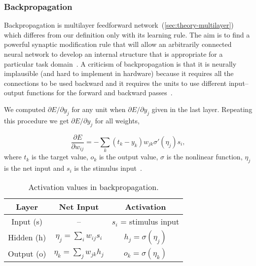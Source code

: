 \subsubsection{Backpropagation}
\label{sec:models-bp} 

Backpropagation is multilayer feedforward network~(\ref{sec:theory-multilayer}) which differes from our definition only with its learning rule. The aim is to find a powerful synaptic modification rule that will allow an arbitrarily connected neural network to develop an internal structure that is appropriate for a particular task domain~\citep{rumelhart1986learning}. A criticism of backpropagation is that it is neurally implausible (and hard to implement in hardware) because it requires all the connections to be used backward and it requires the units to use different input--output functions for the forward and backward passes~\citep{hinton1988learning}.

We computed $\partial E / \partial y_j$ for any unit when $\partial E / \partial y_j$ given in the last layer. Repeating this procedure we get $\partial E / \partial y_j$ for all weights, 

\begin{equation} 
\frac{\partial E}{\partial w_{ij}} = -\sum_k(t_k-y_k)w_{jk}\sigma'(\eta_j)s_i,
\end{equation}
where $t_k$ is the target value, $o_k$ is the output value, $\sigma$ is the nonlinear function, $\eta_j$ is the net input and $s_i$ is the stimulus input~\citep{o1996bio}.

\begin{table}[H] 
  \centering
  \begin{tabular}{|ccc|}
    \hline
    Layer & Net Input & Activation\\
    \hline
    Input (s)  & -- & $s_i$ = stimulus input\\
    \hline
    Hidden (h) & \hspace{0.3cm} $\eta_j = \sum_i w_{ij}s_i$ \hspace{0.3cm} &
    $h_j = \sigma(\eta_j)$\hspace{0.3cm}\\
    \hline
    Output (o) & \hspace{0.3cm} $\eta_k = \sum_j w_{jk}h_j$ \hspace{0.3cm} & 
    $o_k = \sigma(\eta_k)$\hspace{0.3cm}\\
    \hline
  \end{tabular}
  \caption{Activation values in backpropagation.}
  \label{tab:models-bp}
\end{table}
